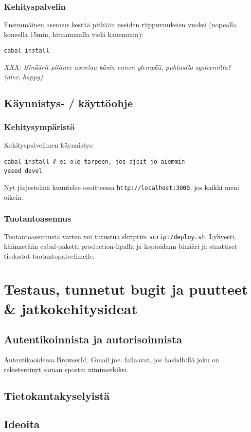 \documentclass[a4paper,12pt]{report}
\begin{document}
\subsection{Kehityspalvelin}

Ensimmäinen asennus kestää pitkään useiden riippuvuuksien vuoksi (nopealla
koneella 15min, hitaammalla vielä kauemmin):
\begin{verbatim}
cabal install
\end{verbatim}

\textit{XXX: Binäärit pitänee asentaa käsin ennen ylempää, puhtaalla systeemilla?
(alex, happy)}

\section{Käynnistys- / käyttöohje}

\subsection{Kehitysympäristö}

Kehityspalvelimen käynnistys:
\begin{verbatim}
cabal install # ei ole tarpeen, jos ajoit jo aiemmin
yesod devel
\end{verbatim}

Nyt järjestelmä kuuntelee osoitteessa \texttt{http://localhost:3000}, jos kaikki
meni oikein.

\subsection{Tuotantoasennus}

Tuotantoasennusta varten voi tutustua skriptiin \texttt{script/deploy.sh}.
Lyhyesti, käännetään cabal-paketti production-lipalla ja kopioidaan binääri ja
staattiset tiedostot tuotantopalvelimelle.

\chapter{Testaus, tunnetut bugit ja puutteet \& jatkokehitysideat}

\section*{Autentikoinnista ja autorisoinnista}

Autentikaoidessa BrowserId, Gmail jne. failaavat, jos hashdb:llä joku on
rekisteröinyt saman spostin nimimerkiksi.

\section*{Tietokantakyselyistä}

\section*{Ideoita}


\end{document}
